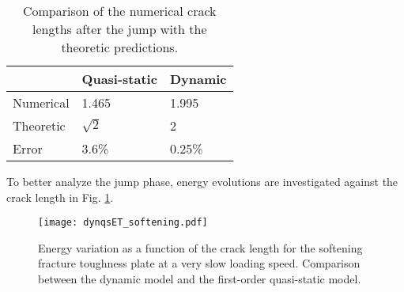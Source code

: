 \begin{table}[htbp]
\centering
\caption{Comparison of the numerical crack lengths after the jump with the theoretic predictions.} \label{tab:compljump}
\begin{tabular}{lll} \toprule
& Quasi-static & Dynamic \\ \midrule
Numerical & 1.465 & 1.995 \\
Theoretic & $\sqrt{2}$ & 2 \\
Error & 3.6\% & 0.25\% \\ \bottomrule
\end{tabular}
\end{table}

To better analyze the jump phase, energy evolutions are investigated against the crack length in Fig. \ref{fig:evoRNJjump}.
\begin{figure}[htbp]
\centering
\texttt{[image: dynqsET\_softening.pdf]}
\caption{Energy variation as a function of the crack length for the softening fracture toughness plate at a very slow loading speed. Comparison between the dynamic model and the first-order quasi-static model.} \label{fig:evoRNJjump}
\end{figure}
